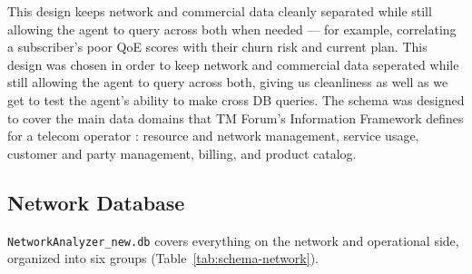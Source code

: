 This design keeps network and commercial data cleanly separated
while still allowing the agent to query across both when needed --- for example,
correlating a subscriber's poor QoE scores with their churn risk and current
plan.
This design was chosen in order to keep network and commercial data seperated
while still allowing the agent to query across both, giving us cleanliness as 
well as we get to test the agent's ability to make cross DB queries. 
The schema was designed to cover the main data domains that TM Forum's Information Framework defines for a telecom operator \cite{tmforum_sid}: resource and network management, service usage, customer and party management, billing, and product catalog.

\subsection{Network Database}

\texttt{NetworkAnalyzer\_new.db} covers everything on the network and
operational side, organized into six groups (Table~\ref{tab:schema-network}).

